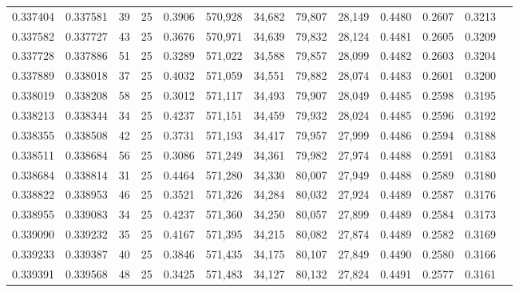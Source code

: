 \begin{tabular}{rrrrrrrrrrrrr}
0.337404 & 0.337581 &    39 &  25 &                                     0.3906 & 570,928 &  34,682 &  79,807 &  28,149 & 0.4480 & 0.2607 & 0.3213 \\
0.337582 & 0.337727 &    43 &  25 &                                     0.3676 & 570,971 &  34,639 &  79,832 &  28,124 & 0.4481 & 0.2605 & 0.3209 \\
0.337728 & 0.337886 &    51 &  25 &                                     0.3289 & 571,022 &  34,588 &  79,857 &  28,099 & 0.4482 & 0.2603 & 0.3204 \\
0.337889 & 0.338018 &    37 &  25 &                                     0.4032 & 571,059 &  34,551 &  79,882 &  28,074 & 0.4483 & 0.2601 & 0.3200 \\
0.338019 & 0.338208 &    58 &  25 &                                     0.3012 & 571,117 &  34,493 &  79,907 &  28,049 & 0.4485 & 0.2598 & 0.3195 \\
0.338213 & 0.338344 &    34 &  25 &                                     0.4237 & 571,151 &  34,459 &  79,932 &  28,024 & 0.4485 & 0.2596 & 0.3192 \\
0.338355 & 0.338508 &    42 &  25 &                                     0.3731 & 571,193 &  34,417 &  79,957 &  27,999 & 0.4486 & 0.2594 & 0.3188 \\
0.338511 & 0.338684 &    56 &  25 &                                     0.3086 & 571,249 &  34,361 &  79,982 &  27,974 & 0.4488 & 0.2591 & 0.3183 \\
0.338684 & 0.338814 &    31 &  25 &                                     0.4464 & 571,280 &  34,330 &  80,007 &  27,949 & 0.4488 & 0.2589 & 0.3180 \\
0.338822 & 0.338953 &    46 &  25 &                                     0.3521 & 571,326 &  34,284 &  80,032 &  27,924 & 0.4489 & 0.2587 & 0.3176 \\
0.338955 & 0.339083 &    34 &  25 &                                     0.4237 & 571,360 &  34,250 &  80,057 &  27,899 & 0.4489 & 0.2584 & 0.3173 \\
0.339090 & 0.339232 &    35 &  25 &                                     0.4167 & 571,395 &  34,215 &  80,082 &  27,874 & 0.4489 & 0.2582 & 0.3169 \\
0.339233 & 0.339387 &    40 &  25 &                                     0.3846 & 571,435 &  34,175 &  80,107 &  27,849 & 0.4490 & 0.2580 & 0.3166 \\
0.339391 & 0.339568 &    48 &  25 &                                     0.3425 & 571,483 &  34,127 &  80,132 &  27,824 & 0.4491 & 0.2577 & 0.3161 \\

\end{tabular}
